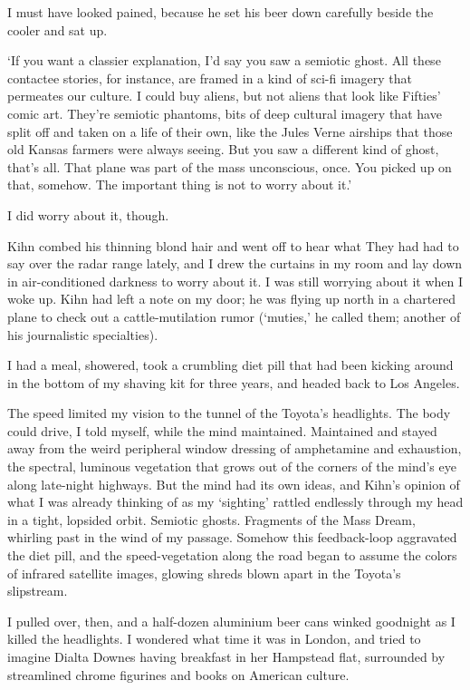 I must have looked pained, because he set his beer down carefully beside the cooler and sat up.

`If you want a classier explanation, I'd say you saw a semiotic ghost. All these contactee stories, for instance, are framed in a kind of sci-fi imagery that permeates our culture. I could buy aliens, but not aliens that look like Fifties' comic art. They're semiotic phantoms, bits of deep cultural imagery that have split off and taken on a life of their own, like the Jules Verne airships that those old Kansas farmers were always seeing. But you saw a different kind of ghost, that's all. That plane was part of the mass unconscious, once. You picked up on that, somehow. The important thing is not to worry about it.'

I did worry about it, though.

Kihn combed his thinning blond hair and went off to hear what They had had to say over the radar range lately, and I drew the curtains in my room and lay down in air-conditioned darkness to worry about it. I was still worrying about it when I woke up. Kihn had left a note on my door; he was flying up north in a chartered plane to check out a cattle-mutilation rumor (`muties,' he called them; another of his journalistic specialties).

I had a meal, showered, took a crumbling diet pill that had been kicking around in the bottom of my shaving kit for three years, and headed back to Los Angeles.

The speed limited my vision to the tunnel of the Toyota's headlights. The body could drive, I told myself, while the mind maintained. Maintained and stayed away from the weird peripheral window dressing of amphetamine and exhaustion, the spectral, luminous vegetation that grows out of the corners of the mind's eye along late-night highways. But the mind had its own ideas, and Kihn's opinion of what I was already thinking of as my `sighting' rattled endlessly through my head in a tight, lopsided orbit. Semiotic ghosts. Fragments of the Mass Dream, whirling past in the wind of my passage. Somehow this feedback-loop aggravated the diet pill, and the speed-vegetation along the road began to assume the colors of infrared satellite images, glowing shreds blown apart in the Toyota's slipstream.

I pulled over, then, and a half-dozen aluminium beer cans winked goodnight as I killed the headlights. I wondered what time it was in London, and tried to imagine Dialta Downes having breakfast in her Hampstead flat, surrounded by streamlined chrome figurines and books on American culture.

